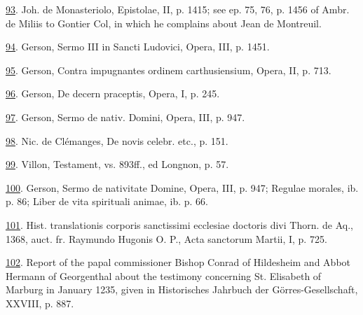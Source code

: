 \protect\hypertarget{23_NOTES.xhtmlux5cux23id_1087}{\protect\hyperlink{13_Chapter_Six__THE_DEPICTION_OF_TH.xhtmlux5cux23id_1086}{93}}.
Joh. de Monasteriolo, Epistolae, II, p. 1415; see ep. 75, 76, p. 1456 of
Ambr. de Miliis to Gontier Col, in which he complains about Jean de
Montreuil.

\protect\hypertarget{23_NOTES.xhtmlux5cux23id_1085}{\protect\hyperlink{13_Chapter_Six__THE_DEPICTION_OF_TH.xhtmlux5cux23id_1084}{94}}.
Gerson, Sermo III in Sancti Ludovici, Opera, III, p. 1451.

\protect\hypertarget{23_NOTES.xhtmlux5cux23id_1083}{\protect\hyperlink{13_Chapter_Six__THE_DEPICTION_OF_TH.xhtmlux5cux23id_1082}{95}}.
Gerson, Contra impugnantes ordinem carthusiensium, Opera, II, p. 713.

\protect\hypertarget{23_NOTES.xhtmlux5cux23id_1081}{\protect\hyperlink{13_Chapter_Six__THE_DEPICTION_OF_TH.xhtmlux5cux23id_1080}{96}}.
Gerson, De decern praceptis, Opera, I, p. 245.

\protect\hypertarget{23_NOTES.xhtmlux5cux23id_1079}{\protect\hyperlink{13_Chapter_Six__THE_DEPICTION_OF_TH.xhtmlux5cux23id_1078}{97}}.
Gerson, Sermo de nativ. Domini, Opera, III, p. 947.

\protect\hypertarget{23_NOTES.xhtmlux5cux23id_1077}{\protect\hyperlink{13_Chapter_Six__THE_DEPICTION_OF_TH.xhtmlux5cux23id_1076}{98}}.
Nic. de Clémanges, De novis celebr. etc., p. 151.

\protect\hypertarget{23_NOTES.xhtmlux5cux23id_1075}{\protect\hyperlink{13_Chapter_Six__THE_DEPICTION_OF_TH.xhtmlux5cux23id_1074}{99}}.
Villon, Testament, vs. 893ff., ed Longnon, p. 57.

\protect\hypertarget{23_NOTES.xhtmlux5cux23id_1073}{\protect\hyperlink{13_Chapter_Six__THE_DEPICTION_OF_TH.xhtmlux5cux23id_1072}{100}}.
Gerson, Sermo de nativitate Domine, Opera, III, p. 947; Regulae morales,
ib. p. 86; Liber de vita spirituali animae, ib. p. 66.

\protect\hypertarget{23_NOTES.xhtmlux5cux23id_1071}{\protect\hyperlink{13_Chapter_Six__THE_DEPICTION_OF_TH.xhtmlux5cux23id_1070}{101}}.
Hist. translationis corporis sanctissimi ecclesiae doctoris divi Thorn.
de Aq., 1368, auct. fr. Raymundo Hugonis O. P., Acta sanctorum Martii,
I, p. 725.

\protect\hypertarget{23_NOTES.xhtmlux5cux23id_1069}{\protect\hyperlink{13_Chapter_Six__THE_DEPICTION_OF_TH.xhtmlux5cux23id_1068}{102}}.
Report of the papal commissioner Bishop Conrad of Hildesheim and Abbot
Hermann of Georgenthal about the testimony concerning St. Elisabeth of
Marburg in January 1235, given in Historisches Jahrbuch der
Görres-Gesellschaft, XXVIII, p. 887.


